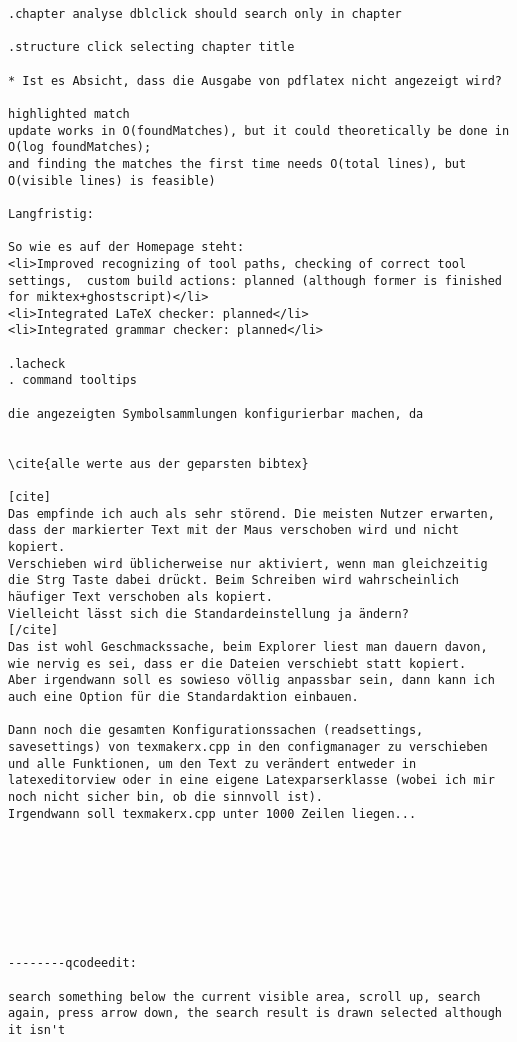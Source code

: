 \documentclass[10pt,a4paper,landscape]{report}
\begin{document}
\begin{verbatim}
.chapter analyse dblclick should search only in chapter 

.structure click selecting chapter title

* Ist es Absicht, dass die Ausgabe von pdflatex nicht angezeigt wird?

highlighted match
update works in O(foundMatches), but it could theoretically be done in O(log foundMatches);
and finding the matches the first time needs O(total lines), but O(visible lines) is feasible)

Langfristig:

So wie es auf der Homepage steht:
<li>Improved recognizing of tool paths, checking of correct tool settings,  custom build actions: planned (although former is finished for miktex+ghostscript)</li>
<li>Integrated LaTeX checker: planned</li>
<li>Integrated grammar checker: planned</li>

.lacheck
. command tooltips

die angezeigten Symbolsammlungen konfigurierbar machen, da


\cite{alle werte aus der geparsten bibtex}

[cite]
Das empfinde ich auch als sehr störend. Die meisten Nutzer erwarten, dass der markierter Text mit der Maus verschoben wird und nicht kopiert.
Verschieben wird üblicherweise nur aktiviert, wenn man gleichzeitig die Strg Taste dabei drückt. Beim Schreiben wird wahrscheinlich häufiger Text verschoben als kopiert.
Vielleicht lässt sich die Standardeinstellung ja ändern? 
[/cite]
Das ist wohl Geschmackssache, beim Explorer liest man dauern davon, wie nervig es sei, dass er die Dateien verschiebt statt kopiert.
Aber irgendwann soll es sowieso völlig anpassbar sein, dann kann ich auch eine Option für die Standardaktion einbauen.

Dann noch die gesamten Konfigurationssachen (readsettings, savesettings) von texmakerx.cpp in den configmanager zu verschieben und alle Funktionen, um den Text zu verändert entweder in latexeditorview oder in eine eigene Latexparserklasse (wobei ich mir noch nicht sicher bin, ob die sinnvoll ist).
Irgendwann soll texmakerx.cpp unter 1000 Zeilen liegen...








--------qcodeedit:

search something below the current visible area, scroll up, search again, press arrow down, the search result is drawn selected although it isn't

\end{verbatim}
\end{document}
